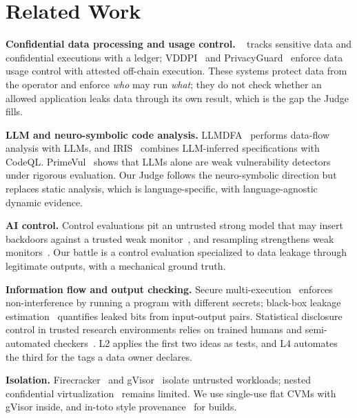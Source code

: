 \section{Related Work}\label{sec:related}

\textbf{Confidential data processing and usage control.} \sys~\cite{nascimento2020dnat} tracks
sensitive data and confidential executions with a ledger; VDDPI~\cite{tokuda2026vddpi} and
PrivacyGuard~\cite{xiao2020privacyguard} enforce data usage control with attested off-chain
execution. These systems protect data from the operator and enforce \emph{who} may run \emph{what};
they do not check whether an allowed application leaks data through its own result, which is the
gap the Judge fills.

\textbf{LLM and neuro-symbolic code analysis.} LLMDFA~\cite{wang2024llmdfa} performs data-flow
analysis with LLMs, and IRIS~\cite{li2025iris} combines LLM-inferred specifications with CodeQL.
PrimeVul~\cite{ding2025primevul} shows that LLMs alone are weak vulnerability detectors under
rigorous evaluation. Our Judge follows the neuro-symbolic direction but replaces static
analysis, which is language-specific, with language-agnostic dynamic evidence.

\textbf{AI control.} Control evaluations pit an untrusted strong model that may insert backdoors
against a trusted weak monitor~\cite{greenblatt2024aicontrol}, and resampling strengthens weak
monitors~\cite{bhatt2025ctrlz}. Our battle is a control evaluation specialized to data leakage
through legitimate outputs, with a mechanical ground truth.

\textbf{Information flow and output checking.} Secure multi-execution~\cite{rafnsson2016sme}
enforces non-interference by running a program with different secrets; black-box leakage
estimation~\cite{cherubin2019fbleau} quantifies leaked bits from input-output pairs. Statistical
disclosure control in trusted research environments relies on trained humans and semi-automated
checkers~\cite{green2022acro}. L2 applies the first two ideas as tests, and L4 automates the third
for the tags a data owner declares.

\textbf{Isolation.} Firecracker~\cite{agache2020firecracker} and gVisor~\cite{young2019gvisor}
isolate untrusted workloads; nested confidential virtualization~\cite{takiguchi2026nestedsev}
remains limited. We use single-use flat CVMs with gVisor inside, and in-toto style
provenance~\cite{torresarias2019intoto} for builds.
